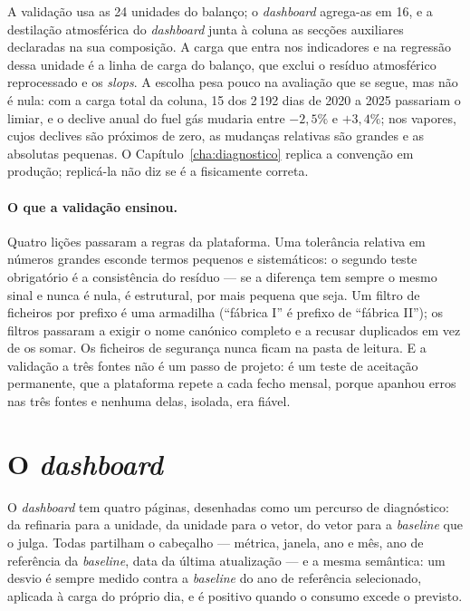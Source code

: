 A validação usa as 24 unidades do balanço; o \emph{dashboard} agrega-as em 16,
e a destilação atmosférica do \emph{dashboard} junta à coluna as secções
auxiliares declaradas na sua composição.  A carga que entra nos indicadores
e na regressão dessa unidade é a linha de carga do balanço, que exclui o
resíduo atmosférico reprocessado e os \emph{slops}. A escolha pesa pouco na
avaliação que se segue, mas não é nula: com a carga total da coluna, 15 dos
2\,192 dias de 2020 a 2025 passariam o limiar, e o declive anual do fuel gás
mudaria entre $-2{,}5\%$ e $+3{,}4\%$; nos vapores, cujos declives são
próximos de zero, as mudanças relativas são grandes e as absolutas
pequenas. O Capítulo~\ref{cha:diagnostico} replica a convenção em produção;
replicá-la não diz se é a fisicamente correta.

\paragraph{O que a validação ensinou.} Quatro lições passaram a regras
da plataforma. Uma tolerância relativa em números grandes esconde termos
pequenos e sistemáticos: o segundo teste obrigatório é a consistência do
resíduo --- se a diferença tem sempre o mesmo sinal e nunca é nula, é
estrutural, por mais pequena que seja. Um filtro de ficheiros por prefixo
é uma armadilha (``fábrica I'' é prefixo de ``fábrica II''); os filtros
passaram a exigir o nome canónico completo e a recusar duplicados em vez
de os somar. Os ficheiros de segurança nunca ficam na pasta de leitura. E
a validação a três fontes não é um passo de projeto: é um teste de
aceitação permanente, que a plataforma repete a cada fecho mensal, porque
apanhou erros nas três fontes e nenhuma delas, isolada, era fiável.

\section{O \emph{dashboard}}
\label{sec:dashboard}

O \emph{dashboard} tem quatro páginas, desenhadas como um percurso de
diagnóstico: da refinaria para a unidade, da unidade para o vetor, do
vetor para a \emph{baseline} que o julga. Todas partilham o cabeçalho
--- métrica, janela, ano e mês, ano de referência da \emph{baseline}, data
da última atualização --- e a mesma semântica: um desvio é sempre medido
contra a \emph{baseline} do ano de referência selecionado, aplicada à carga
do próprio dia, e é positivo quando o consumo excede o previsto.

